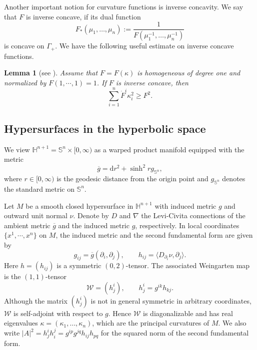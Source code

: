 \documentclass[11pt,reqno]{amsart}
\newtheorem{lemma}[proposition]{Lemma}
\theoremstyle{remark}
\numberwithin{equation}{section}
\begin{document}

Another important notion for curvature functions is inverse concavity. We say that $F$ is inverse concave, if its dual function
\[
F_*(\mu_1,\dots,\mu_n):=\frac{1}{F(\mu_1^{-1},\dots,\mu_n^{-1})}
\]
is concave on $\Gamma_+$. We have the following useful estimate on inverse concave functions.
\begin{lemma}[see {\cite[Lemma 5]{AMZ13}}] Assume that $F=F(\kappa)$ is homogeneous of degree one and normalized by $F(1,\cdots,1)=1$.  If $F$ is inverse concave, then
	\begin{equation}\label{equ-inv2}
			\sum\limits_{i=1}^n \dot{F}^i \kappa_i^2 \geq F^2.
	\end{equation}
\end{lemma}

\subsection{Hypersurfaces in the hyperbolic space}
We view $\mathbb{H}^{n+1}=\mathbb{S}^n\times[0,\infty)$ as a warped product manifold equipped with the metric
\begin{equation*}
	\overline{g} = \mathrm{d}r^2 + \sinh^2 r g_{\mathbb{S}^n},
\end{equation*}
where $r\in[0,\infty)$ is the geodesic distance from the origin point and $g_{\mathbb{S}^n}$ denotes the standard metric on $\mathbb{S}^n$.

Let $M$ be a smooth closed hypersurface in $\mathbb{H}^{n+1}$ with induced metric $g$ and outward unit normal $\nu$. Denote by $D$ and $\nabla$ the Levi-Civita connections of the ambient metric $\overline{g}$ and the induced metric $g$, respectively. In local coordinates $\{x^1,\cdots,x^n\}$ on $M$, the induced metric and the second fundamental form are given by 
\[g_{ij} = \overline{g}(\partial_i,\partial_j),\qquad h_{ij} = \langle D_{\partial_i}\nu,\partial_j\rangle.\]
Here $h=(h_{ij})$ is a symmetric $(0,2)$-tensor. The associated Weingarten map is the $(1,1)$-tensor 
\[\mathcal{W} = (h^i_j),\qquad h^i_j = g^{ik}h_{kj}.\]  
Although the matrix \((h^i_j)\) is not in general symmetric in arbitrary coordinates, \(\mathcal W\) is self-adjoint with respect to \(g\). Hence \(\mathcal W\) is diagonalizable and has real eigenvalues
$\kappa=(\kappa_1,\dots,\kappa_n)$, which are the principal curvatures of \(M\). We also write $|A|^2=h^i_j h^j_i=g^{ip}g^{jq}h_{ij}h_{pq}$ for the squared norm of the second fundamental form.
\end{document}
